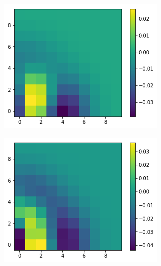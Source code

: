 \documentclass[11pt]{article}
\begin{document}
\begin{figure}[h]
	\centering
	\begin{subfigure}{0.3\textwidth}
		\centering
		\includegraphics[width=\textwidth]{squareice_images/logreg_2d_181}
	\end{subfigure}
	\begin{subfigure}{0.3\textwidth}
		\centering
		\includegraphics[width=\textwidth]{squareice_images/logreg_2d_squareice}
	\end{subfigure}
	\begin{subfigure}{0.3\textwidth}

\end{subfigure}
\end{figure}
\end{document}
